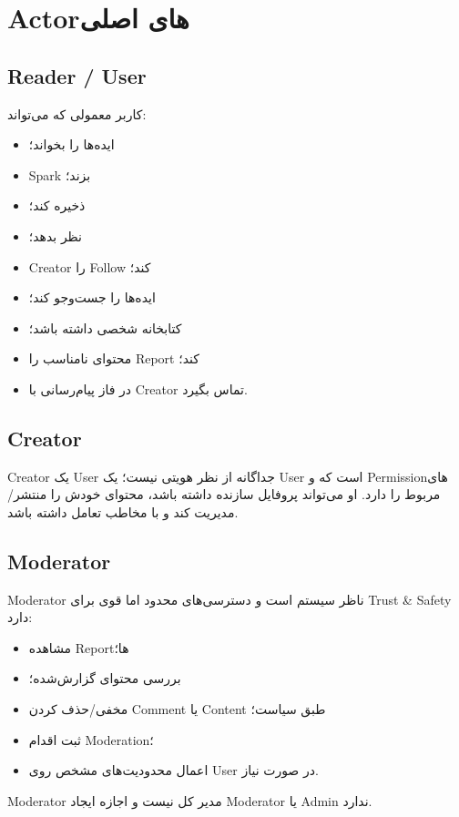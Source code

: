 \section{Actorهای اصلی}

\subsection{Reader / User}

کاربر معمولی که می‌تواند:
\begin{itemize}
  \item ایده‌ها را بخواند؛
  \item Spark بزند؛
  \item ذخیره کند؛
  \item نظر بدهد؛
  \item Creator را Follow کند؛
  \item ایده‌ها را جست‌وجو کند؛
  \item کتابخانه شخصی داشته باشد؛
  \item محتوای نامناسب را Report کند؛
  \item در فاز پیام‌رسانی با Creator تماس بگیرد.
\end{itemize}

\subsection{Creator}

Creator یک User جداگانه از نظر هویتی نیست؛ یک User است که  و Permissionهای مربوط را دارد. او می‌تواند پروفایل سازنده داشته باشد، محتوای خودش را منتشر/مدیریت کند و با مخاطب تعامل داشته باشد.

\subsection{Moderator}

Moderator ناظر سیستم است و دسترسی‌های محدود اما قوی برای Trust \& Safety دارد:
\begin{itemize}
  \item مشاهده Reportها؛
  \item بررسی محتوای گزارش‌شده؛
  \item مخفی/حذف کردن Comment یا Content طبق سیاست؛
  \item ثبت اقدام Moderation؛
  \item اعمال محدودیت‌های مشخص روی User در صورت نیاز.
\end{itemize}

Moderator مدیر کل نیست و اجازه ایجاد Moderator یا Admin ندارد.

